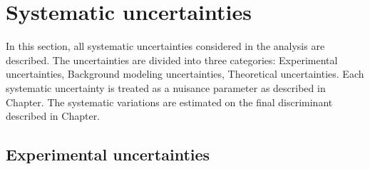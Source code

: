 \chapter{Systematic uncertainties}
In this section, all systematic uncertainties considered in the analysis are described. The uncertainties are divided into three categories:
Experimental uncertainties, Background modeling uncertainties, Theoretical uncertainties. Each systematic uncertainty is treated as a nuisance parameter as described in Chapter{}. The systematic variations are estimated on the final discriminant described in Chapter{}.

\section{Experimental uncertainties}


